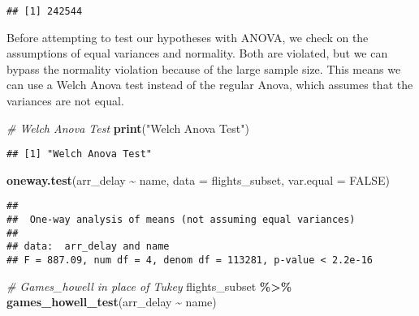 \documentclass[
]{article}
\newenvironment{Shaded}{\begin{snugshade}}{\end{snugshade}}
\newcommand{\AttributeTok}[1]{\textcolor[rgb]{0.13,0.29,0.53}{#1}}
\newcommand{\CommentTok}[1]{\textcolor[rgb]{0.56,0.35,0.01}{\textit{#1}}}
\newcommand{\ConstantTok}[1]{\textcolor[rgb]{0.56,0.35,0.01}{#1}}
\newcommand{\FunctionTok}[1]{\textcolor[rgb]{0.13,0.29,0.53}{\textbf{#1}}}
\newcommand{\NormalTok}[1]{#1}
\newcommand{\SpecialCharTok}[1]{\textcolor[rgb]{0.81,0.36,0.00}{\textbf{#1}}}
\newcommand{\StringTok}[1]{\textcolor[rgb]{0.31,0.60,0.02}{#1}}
\begin{document}
\begin{Shaded}
\end{Shaded}

\begin{verbatim}
## [1] 242544
\end{verbatim}

Before attempting to test our hypotheses with ANOVA, we check on the
assumptions of equal variances and normality. Both are violated, but we
can bypass the normality violation because of the large sample size.
This means we can use a Welch Anova test instead of the regular Anova,
which assumes that the variances are not equal.

\begin{Shaded}
\begin{Highlighting}[]
\CommentTok{\# Welch Anova Test}
\FunctionTok{print}\NormalTok{(}\StringTok{"Welch Anova Test"}\NormalTok{)}
\end{Highlighting}
\end{Shaded}

\begin{verbatim}
## [1] "Welch Anova Test"
\end{verbatim}

\begin{Shaded}
\begin{Highlighting}[]
\FunctionTok{oneway.test}\NormalTok{(arr\_delay }\SpecialCharTok{\textasciitilde{}}\NormalTok{ name, }\AttributeTok{data =}\NormalTok{ flights\_subset, }\AttributeTok{var.equal =} \ConstantTok{FALSE}\NormalTok{)}
\end{Highlighting}
\end{Shaded}

\begin{verbatim}
## 
##  One-way analysis of means (not assuming equal variances)
## 
## data:  arr_delay and name
## F = 887.09, num df = 4, denom df = 113281, p-value < 2.2e-16
\end{verbatim}

\begin{Shaded}
\begin{Highlighting}[]
\CommentTok{\# Games\_howell in place of Tukey}
\NormalTok{flights\_subset }\SpecialCharTok{\%\textgreater{}\%}
  \FunctionTok{games\_howell\_test}\NormalTok{(arr\_delay }\SpecialCharTok{\textasciitilde{}}\NormalTok{ name)}
\end{Highlighting}
\end{Shaded}
\end{document}
